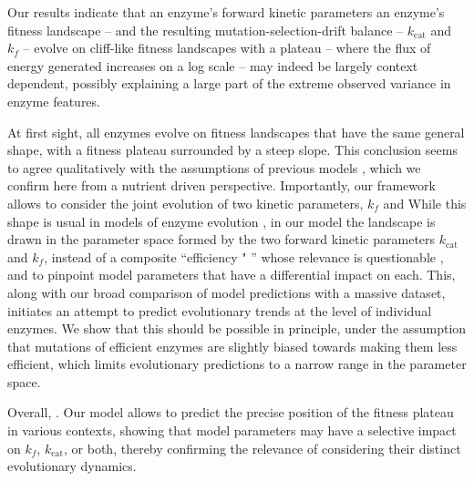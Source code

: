 \documentclass[11pt,onecolumn]{article}
\providecommand{\DIFadd}[1]{{\protect\color{blue} \sf #1}} %
\providecommand{\DIFdel}[1]{{\protect\color{red} \scriptsize #1}} %
\providecommand{\DIFaddbegin}{} %
\providecommand{\DIFaddend}{} %
\providecommand{\DIFdelbegin}{} %
\providecommand{\DIFdelend}{} %
\begin{document}
\DIFdel{Our results indicate that an enzyme's forward kinetic parameters }\DIFdelend \DIFaddbegin \DIFadd{an enzyme's fitness landscape -- and the resulting mutation-selection-drift balance }\DIFaddend -- \DIFdelbegin \DIFdel{$k_\text{cat}$ and $k_f$ -- evolve on cliff-like fitness landscapes with a plateau -- where the flux of energy generated increases on a log scale -- }\DIFdelend \DIFaddbegin \DIFadd{may indeed be largely context dependent, possibly explaining a large part of the extreme observed variance in enzyme features.
}

\DIFadd{At first sight, all enzymes evolve on fitness landscapes that have the same general shape, with a fitness plateau }\DIFaddend surrounded by a steep slope. \DIFdelbegin \DIFdel{This conclusion seems to agree qualitatively with the assumptions of previous models \citep{Hartl85,Kaltenbach14}, which we confirm here from a nutrient driven perspective.
Importantly, our framework allows to consider the joint evolution of two kinetic parameters, $k_f$ and }\DIFdelend \DIFaddbegin \DIFadd{While this shape is usual in models of enzyme evolution \citep{Hartl85,Kaltenbach14,Yi19}, in our model the landscape is drawn in the parameter space formed by the two forward kinetic parameters }\DIFaddend $k_\text{cat}$ \DIFaddbegin \DIFadd{and $k_f$, }\DIFaddend instead of a composite ``efficiency\DIFdelbegin \DIFdel{" }\DIFdelend \DIFaddbegin \DIFadd{'' }\DIFaddend whose relevance is questionable \DIFdelbegin \DIFdel{\citep{Koshland02,Eisenthal07}, and to pinpoint model parameters that have a differential impact on each. This, along with our broad comparison of model predictions with a massive dataset, initiates an attempt to predict evolutionary trends at the level of individual enzymes. 
We show that this should be possible in principle, under the assumption that mutations of efficient enzymes are slightly biased towards making them less efficient, which limits evolutionary predictions to a narrow range in the parameter space.
}%

\DIFdel{Overall, }\DIFdelend \DIFaddbegin \DIFadd{\citep{Eisenthal07,Koshland02}. Our model allows to predict the precise position of the fitness plateau in various contexts, showing that model parameters may have a selective impact on $k_f$, $k_\text{cat}$, or both, thereby confirming the relevance of considering their distinct evolutionary dynamics. 
}
\end{document}
